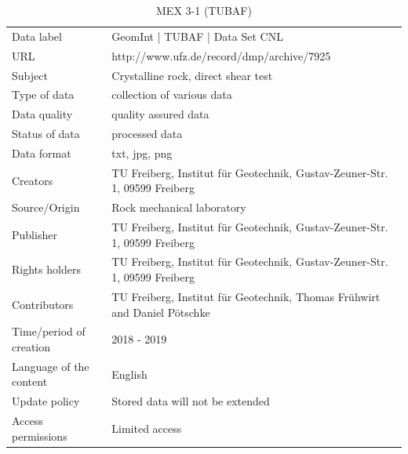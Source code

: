 \begin{table}[!ht]
\caption{MEX 3-1 (TUBAF)}
\label{tab:dms-mex3-1}
\small
\begin{tabular}{R{3cm}|L{7cm}}
\hline
%
Data label & GeomInt | TUBAF | Data Set CNL \\
URL & http://www.ufz.de/record/dmp/archive/7925 \\
Subject  & Crystalline rock, direct shear test \\
Type of data  & collection of various data \\
Data quality  & quality assured data \\
Status of data  & processed data \\
Data format  & txt, jpg, png \\
Creators  & TU Freiberg, Institut für Geotechnik, Gustav-Zeuner-Str. 1, 09599 Freiberg \\
Source/Origin  & Rock mechanical laboratory \\
Publisher  & TU Freiberg, Institut für Geotechnik, Gustav-Zeuner-Str. 1, 09599 Freiberg \\
Rights holders  & TU Freiberg, Institut für Geotechnik, Gustav-Zeuner-Str. 1, 09599 Freiberg \\
Contributors  & TU Freiberg, Institut für Geotechnik, Thomas Fr\"uhwirt and Daniel P\"otschke \\
Time/period of creation  & 2018 - 2019 \\
Language of the content & English \\
Update policy  & Stored data will not be extended \\
Access permissions  & Limited access \\
%
\hline
\end{tabular}
\end{table}